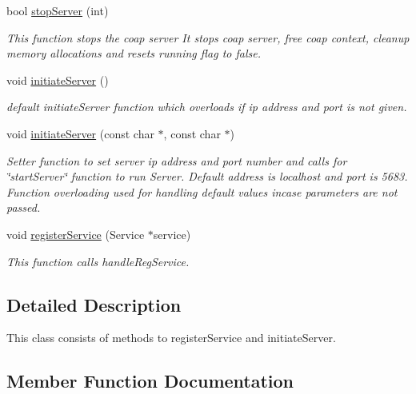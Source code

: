 \begin{DoxyCompactItemize}
\mbox{\label{classcoappbrpc_1_1RpcServer_a494a1edf0c9d7b18d37af45e3967d1d6}} 
bool \hyperlink{classcoappbrpc_1_1RpcServer_a494a1edf0c9d7b18d37af45e3967d1d6}{stop\+Server} (int)
\begin{DoxyCompactList}\small\item\em This function stops the coap server It stops coap server, free coap context, cleanup memory allocations and resets running flag to false. \end{DoxyCompactList}\item 
\mbox{\label{classcoappbrpc_1_1RpcServer_a1b68fbac53eeab5c2533603931e01f6a}} 
void \hyperlink{classcoappbrpc_1_1RpcServer_a1b68fbac53eeab5c2533603931e01f6a}{initiate\+Server} ()
\begin{DoxyCompactList}\small\item\em default initiate\+Server function which overloads if ip address and port is not given. \end{DoxyCompactList}\item 
void \hyperlink{classcoappbrpc_1_1RpcServer_ae9dc062a4faf0591f6b8f70bfcf281a7}{initiate\+Server} (const char $\ast$, const char $\ast$)
\begin{DoxyCompactList}\small\item\em Setter function to set server ip address and port number and calls for \char`\"{}start\+Server\char`\"{} function to run Server. Default address is localhost and port is 5683. Function overloading used for handling default values incase parameters are not passed. \end{DoxyCompactList}\item 
void \hyperlink{classcoappbrpc_1_1RpcServer_acc9877a9bfff6783aa0261942d2917c2}{register\+Service} (Service $\ast$service)
\begin{DoxyCompactList}\small\item\em This function calls handle\+Reg\+Service. \end{DoxyCompactList}\end{DoxyCompactItemize}


\subsection{Detailed Description}
This class consists of methods to register\+Service and initiate\+Server. 

\subsection{Member Function Documentation}
\mbox{\label{classcoappbrpc_1_1RpcServer_ae9dc062a4faf0591f6b8f70bfcf281a7}} 
